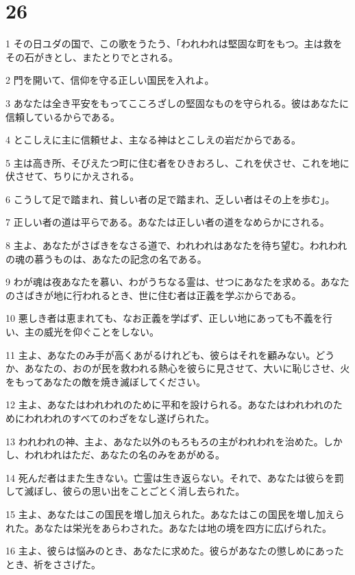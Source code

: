\chapter{26}

\par 1 その日ユダの国で、この歌をうたう、「われわれは堅固な町をもつ。主は救をその石がきとし、またとりでとされる。
\par 2 門を開いて、信仰を守る正しい国民を入れよ。
\par 3 あなたは全き平安をもってこころざしの堅固なものを守られる。彼はあなたに信頼しているからである。
\par 4 とこしえに主に信頼せよ、主なる神はとこしえの岩だからである。
\par 5 主は高き所、そびえたつ町に住む者をひきおろし、これを伏させ、これを地に伏させて、ちりにかえされる。
\par 6 こうして足で踏まれ、貧しい者の足で踏まれ、乏しい者はその上を歩む」。
\par 7 正しい者の道は平らである。あなたは正しい者の道をなめらかにされる。
\par 8 主よ、あなたがさばきをなさる道で、われわれはあなたを待ち望む。われわれの魂の慕うものは、あなたの記念の名である。
\par 9 わが魂は夜あなたを慕い、わがうちなる霊は、せつにあなたを求める。あなたのさばきが地に行われるとき、世に住む者は正義を学ぶからである。
\par 10 悪しき者は恵まれても、なお正義を学ばず、正しい地にあっても不義を行い、主の威光を仰ぐことをしない。
\par 11 主よ、あなたのみ手が高くあがるけれども、彼らはそれを顧みない。どうか、あなたの、おのが民を救われる熱心を彼らに見させて、大いに恥じさせ、火をもってあなたの敵を焼き滅ぼしてください。
\par 12 主よ、あなたはわれわれのために平和を設けられる。あなたはわれわれのためにわれわれのすべてのわざをなし遂げられた。
\par 13 われわれの神、主よ、あなた以外のもろもろの主がわれわれを治めた。しかし、われわれはただ、あなたの名のみをあがめる。
\par 14 死んだ者はまた生きない。亡霊は生き返らない。それで、あなたは彼らを罰して滅ぼし、彼らの思い出をことごとく消し去られた。
\par 15 主よ、あなたはこの国民を増し加えられた。あなたはこの国民を増し加えられた。あなたは栄光をあらわされた。あなたは地の境を四方に広げられた。
\par 16 主よ、彼らは悩みのとき、あなたに求めた。彼らがあなたの懲しめにあったとき、祈をささげた。
